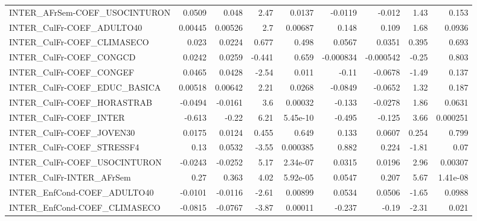 \begin{tabular}{lrrrrrrrr}
INTER\_AFrSem-COEF\_USOCINTURON         &      0.0509 &        0.048 &    2.47 &   0.0137 &    -0.0119 &      -0.012 &         1.43 &         0.153 \\
INTER\_CulFr-COEF\_ADULTO40             &     0.00445 &      0.00526 &     2.7 &  0.00687 &      0.148 &       0.109 &         1.68 &        0.0936 \\
INTER\_CulFr-COEF\_CLIMASECO            &       0.023 &       0.0224 &   0.677 &    0.498 &     0.0567 &      0.0351 &        0.395 &         0.693 \\
INTER\_CulFr-COEF\_CONGCD               &      0.0242 &       0.0259 &  -0.441 &    0.659 &  -0.000834 &   -0.000542 &        -0.25 &         0.803 \\
INTER\_CulFr-COEF\_CONGEF               &      0.0465 &       0.0428 &   -2.54 &    0.011 &      -0.11 &     -0.0678 &        -1.49 &         0.137 \\
INTER\_CulFr-COEF\_EDUC\_BASICA          &     0.00518 &      0.00642 &    2.21 &   0.0268 &    -0.0849 &     -0.0652 &         1.32 &         0.187 \\
INTER\_CulFr-COEF\_HORASTRAB            &     -0.0494 &      -0.0161 &     3.6 &  0.00032 &     -0.133 &     -0.0278 &         1.86 &        0.0631 \\
INTER\_CulFr-COEF\_INTER                &      -0.613 &        -0.22 &    6.21 & 5.45e-10 &     -0.495 &      -0.125 &         3.66 &      0.000251 \\
INTER\_CulFr-COEF\_JOVEN30              &      0.0175 &       0.0124 &   0.455 &    0.649 &      0.133 &      0.0607 &        0.254 &         0.799 \\
INTER\_CulFr-COEF\_STRESSF4             &        0.13 &       0.0532 &   -3.55 & 0.000385 &      0.882 &       0.224 &        -1.81 &          0.07 \\
INTER\_CulFr-COEF\_USOCINTURON          &     -0.0243 &      -0.0252 &    5.17 & 2.34e-07 &     0.0315 &      0.0196 &         2.96 &       0.00307 \\
INTER\_CulFr-INTER\_AFrSem              &        0.27 &        0.363 &    4.02 & 5.92e-05 &     0.0547 &       0.207 &         5.67 &      1.41e-08 \\
INTER\_EnfCond-COEF\_ADULTO40           &     -0.0101 &      -0.0116 &   -2.61 &  0.00899 &     0.0534 &      0.0506 &        -1.65 &        0.0988 \\
INTER\_EnfCond-COEF\_CLIMASECO          &     -0.0815 &      -0.0767 &   -3.87 &  0.00011 &     -0.237 &       -0.19 &        -2.31 &         0.021 \\

\end{tabular}
